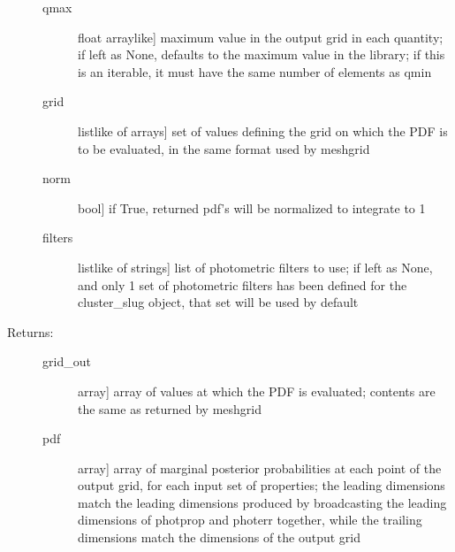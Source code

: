 \documentclass[letterpaper,10pt,english]{sphinxmanual}
\begin{document}
\begin{fulllineitems}
\begin{fulllineitems}
\begin{description}
\begin{description}
\item[{qmax}] \leavevmode{[}float \textbar{} arraylike{]}
maximum value in the output grid in each quantity; if
left as None, defaults to the maximum value in the
library; if this is an iterable, it must have the same
number of elements as qmin

\item[{grid}] \leavevmode{[}listlike of arrays{]}
set of values defining the grid on which the PDF is to
be evaluated, in the same format used by meshgrid

\item[{norm}] \leavevmode{[}bool{]}
if True, returned pdf’s will be normalized to integrate
to 1

\item[{filters}] \leavevmode{[}listlike of strings{]}
list of photometric filters to use; if left as None, and
only 1 set of photometric filters has been defined for
the cluster\_slug object, that set will be used by
default

\end{description}

\item[{Returns:}] \leavevmode\begin{description}
\item[{grid\_out}] \leavevmode{[}array{]}
array of values at which the PDF is evaluated; contents
are the same as returned by meshgrid

\item[{pdf}] \leavevmode{[}array{]}
array of marginal posterior probabilities at each point
of the output grid, for each input set of properties; the leading
dimensions match the leading dimensions produced by
broadcasting the leading dimensions of photprop and
photerr together, while the trailing dimensions match
the dimensions of the output grid

\end{description}

\end{description}

\end{fulllineitems}



\end{fulllineitems}
\end{document}
